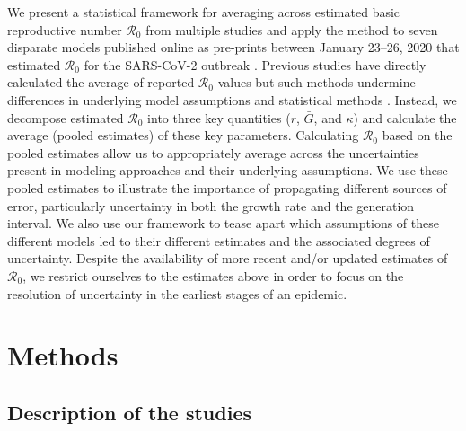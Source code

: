 \documentclass[12pt]{article}
\newcommand{\Ro}{\ensuremath{{\mathcal R}_{0}}\xspace}
\begin{document}
We present a statistical framework for averaging across estimated basic reproductive number \Ro from multiple studies and apply the method to seven disparate models published online as pre-prints between January 23--26, 2020 that estimated \Ro for the SARS-CoV-2 outbreak \citep{bedfordncov, imaincov, liuncov, majumderncov, readncov, riouncov, zhaoncov}.
Previous studies have directly calculated the average of reported \Ro values but such methods undermine differences in underlying model assumptions and statistical methods \citep{majumder2020early, liu2020reproductive}.
Instead, we decompose estimated \Ro into three key quantities ($r$, $\bar G$, and $\kappa$) and calculate the average (pooled estimates) of these key parameters.
Calculating \Ro based on the pooled estimates allow us to appropriately average across the uncertainties present in modeling approaches and their underlying assumptions.
We use these pooled estimates to illustrate the importance of propagating different sources of error, particularly uncertainty in both the growth rate and the generation interval.
We also use our framework to tease apart which assumptions of these different models led to their different estimates and the associated degrees of uncertainty.
Despite the availability of more recent and/or updated estimates of \Ro, we restrict ourselves to the estimates above in order to focus on the resolution of uncertainty in the earliest stages of an epidemic.

\section{Methods}

\subsection{Description of the studies}
\end{document}

